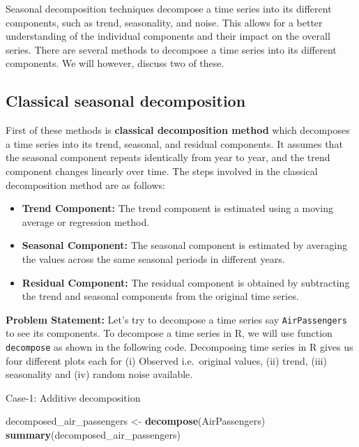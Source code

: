 \documentclass[
]{book}
\newenvironment{Shaded}{\begin{snugshade}}{\end{snugshade}}
\newcommand{\FunctionTok}[1]{\textcolor[rgb]{0.13,0.29,0.53}{\textbf{#1}}}
\newcommand{\NormalTok}[1]{#1}
\newcommand{\OtherTok}[1]{\textcolor[rgb]{0.56,0.35,0.01}{#1}}
\providecommand{\tightlist}{%
  \setlength{\itemsep}{0pt}\setlength{\parskip}{0pt}}
\begin{document}
Seasonal decomposition techniques decompose a time series into its different components, such as trend, seasonality, and noise. This allows for a better understanding of the individual components and their impact on the overall series. There are several methods to decompose a time series into its different components. We will however, discuss two of these.

\hypertarget{classical-seasonal-decomposition}{%
\subsection{Classical seasonal decomposition}\label{classical-seasonal-decomposition}}

First of these methods is \textbf{classical decomposition method} which decomposes a time series into its trend, seasonal, and residual components. It assumes that the seasonal component repeats identically from year to year, and the trend component changes linearly over time. The steps involved in the classical decomposition method are as follows:

\begin{itemize}
\tightlist
\item
  \textbf{Trend Component:} The trend component is estimated using a moving average or regression method.
\item
  \textbf{Seasonal Component:} The seasonal component is estimated by averaging the values across the same seasonal periods in different years.
\item
  \textbf{Residual Component:} The residual component is obtained by subtracting the trend and seasonal components from the original time series.
\end{itemize}

\textbf{Problem Statement:} Let's try to decompose a time series say \texttt{AirPassengers} to see its components. To decompose a time series in R, we will use function \texttt{decompose} as shown in the following code. Decomposing time series in R gives us four different plots each for (i) Observed i.e.~original values, (ii) trend, (iii) seasonality and (iv) random noise available.

Case-1: Additive decomposition

\begin{Shaded}
\begin{Highlighting}[]
\NormalTok{decomposed\_air\_passengers }\OtherTok{\textless{}{-}} \FunctionTok{decompose}\NormalTok{(AirPassengers)}
\FunctionTok{summary}\NormalTok{(decomposed\_air\_passengers)}
\end{Highlighting}
\end{Shaded}
\end{document}

